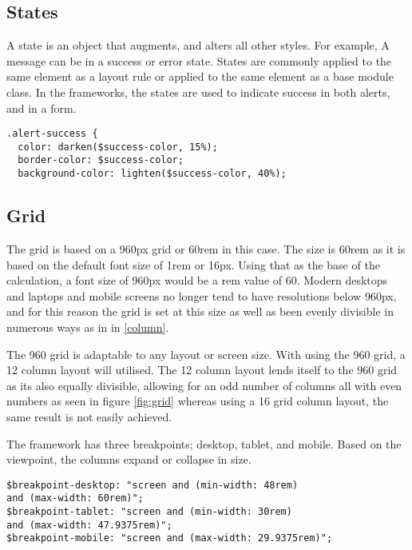\subsection*{States}
A state is an object that augments, and alters all other styles. For example, A message can be in a success or error state. States are commonly applied to the same element as a layout rule or applied to the same element as a base module class. In the frameworks, the states are used to indicate success in both alerts, and in a form. 

\begin{lstlisting}[language=CSS3]
.alert-success {
  color: darken($success-color, 15%);
  border-color: $success-color;
  background-color: lighten($success-color, 40%);
\end{lstlisting}

\newpage
\subsection*{Grid}

The grid is based on a 960px grid or 60rem in this case. The size is 60rem as it is based on the default font size of 1rem or 16px. Using that as the base of the calculation, a font size of 960px would be a \gls{rem} value of 60. Modern desktops and laptops and mobile screens no longer tend to have resolutions below 960px, and for this reason the grid is set at this size as well as been evenly divisible in numerous ways as in in \ref{column}. 

The 960 grid is adaptable to any layout or screen size. With using the 960 grid, a 12 column layout will utilised. The 12 column layout lends itself to the 960 grid as its also equally divisible, allowing for an odd number of columns all with even numbers as seen in figure \ref{fig:grid} whereas using a 16 grid column layout, the same result is not easily achieved. 

The framework has three breakpoints; desktop, tablet, and mobile. Based on the viewpoint, the columns expand or collapse in size. 

\begin{lstlisting}[language=CSS3]
$breakpoint-desktop: "screen and (min-width: 48rem) 
and (max-width: 60rem)";
$breakpoint-tablet: "screen and (min-width: 30rem) 
and (max-width: 47.9375rem)";
$breakpoint-mobile: "screen and (max-width: 29.9375rem)";
\end{lstlisting}

